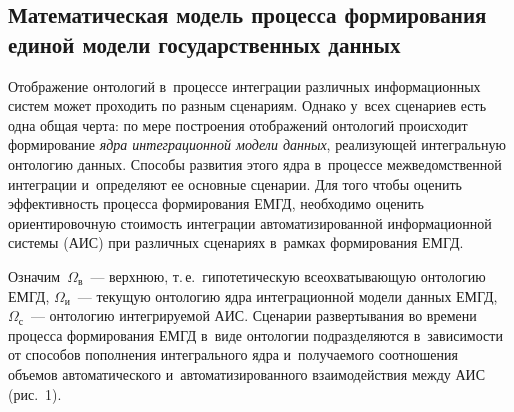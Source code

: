 \begin{multicols}{2}
\vspace*{-6pt}

\section{Математическая модель процесса формирования единой модели государственных данных} %

\vspace*{-4pt}

Отображение онтологий в~процессе интеграции различных информационных 
систем может проходить по разным сценариям. Однако у~всех сценариев 
есть одна общая черта: по мере по\-стро\-ения отображений онтологий 
происходит формирование \textit{ядра интеграционной модели данных}, 
реализующей интегральную онтологию данных. Способы развития этого 
ядра в~процессе межведомственной интеграции и~определяют ее основные 
сценарии. Для того чтобы оценить эффективность процесса формирования 
ЕМГД, необходимо оценить ориентировочную сто\-и\-мость интеграции автоматизированной информационной сис\-те\-мы (АИС) 
при различных сценариях в~рамках формирования ЕМГД.

Означим~$\Omega_{\mathrm{в}}$~--- верхнюю, т.\,е.\ гипотетическую  
все\-охва\-ты\-ва\-ющую онтологию ЕМГД, $\Omega_{\mathrm{и}}$~--- 
текущую онтологию ядра интеграционной модели данных ЕМГД,  
$\Omega_{\mathrm{с}}$~--- онтологию ин\-тег\-ри\-ру\-емой АИС. Сценарии 
развертывания во времени процесса формирования ЕМГД в~виде онтологии 
подразделяются в~за\-ви\-си\-мости от способов пополнения интегрального ядра 
и~по\-лу\-ча\-емо\-го соотношения объемов автоматического 
и~автоматизированного взаимодействия меж\-ду АИС (рис.~1).

\begin{figure*} %
 \vspace*{1pt}
 \begin{center}  
     \mbox{%
\epsfxsize=113.614mm
}
\end{center}
\vspace*{-3pt}
\vspace*{-6pt}
\end{figure*}


\end{multicols}
